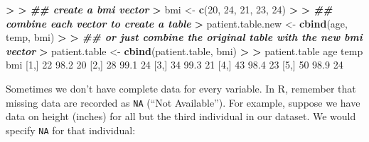 \documentclass[
]{book}
\newenvironment{Shaded}{\begin{snugshade}}{\end{snugshade}}
\newcommand{\DecValTok}[1]{\textcolor[rgb]{0.00,0.00,0.81}{#1}}
\newcommand{\DocumentationTok}[1]{\textcolor[rgb]{0.56,0.35,0.01}{\textbf{\textit{#1}}}}
\newcommand{\ErrorTok}[1]{\textcolor[rgb]{0.64,0.00,0.00}{\textbf{#1}}}
\newcommand{\FloatTok}[1]{\textcolor[rgb]{0.00,0.00,0.81}{#1}}
\newcommand{\FunctionTok}[1]{\textcolor[rgb]{0.13,0.29,0.53}{\textbf{#1}}}
\newcommand{\NormalTok}[1]{#1}
\newcommand{\OtherTok}[1]{\textcolor[rgb]{0.56,0.35,0.01}{#1}}
\newcommand{\SpecialCharTok}[1]{\textcolor[rgb]{0.81,0.36,0.00}{\textbf{#1}}}
\begin{document}
\begin{Shaded}
\begin{Highlighting}[]
\SpecialCharTok{\textgreater{}} 
\ErrorTok{\textgreater{}} \DocumentationTok{\#\# create a bmi vector}
\ErrorTok{\textgreater{}}\NormalTok{ bmi }\OtherTok{\textless{}{-}} \FunctionTok{c}\NormalTok{(}\DecValTok{20}\NormalTok{, }\DecValTok{24}\NormalTok{, }\DecValTok{21}\NormalTok{, }\DecValTok{23}\NormalTok{, }\DecValTok{24}\NormalTok{)}
\SpecialCharTok{\textgreater{}} 
\ErrorTok{\textgreater{}} \DocumentationTok{\#\# combine each vector to create a table}
\ErrorTok{\textgreater{}}\NormalTok{ patient.table.new }\OtherTok{\textless{}{-}} \FunctionTok{cbind}\NormalTok{(age, temp, bmi)}
\SpecialCharTok{\textgreater{}} 
\ErrorTok{\textgreater{}} \DocumentationTok{\#\# or just combine the original table with the new bmi vector}
\ErrorTok{\textgreater{}}\NormalTok{ patient.table }\OtherTok{\textless{}{-}} \FunctionTok{cbind}\NormalTok{(patient.table, bmi)}
\SpecialCharTok{\textgreater{}} 
\ErrorTok{\textgreater{}}\NormalTok{ patient.table}
\NormalTok{     age temp bmi}
\NormalTok{[}\DecValTok{1}\NormalTok{,]  }\DecValTok{22} \FloatTok{98.2}  \DecValTok{20}
\NormalTok{[}\DecValTok{2}\NormalTok{,]  }\DecValTok{28} \FloatTok{99.1}  \DecValTok{24}
\NormalTok{[}\DecValTok{3}\NormalTok{,]  }\DecValTok{34} \FloatTok{99.3}  \DecValTok{21}
\NormalTok{[}\DecValTok{4}\NormalTok{,]  }\DecValTok{43} \FloatTok{98.4}  \DecValTok{23}
\NormalTok{[}\DecValTok{5}\NormalTok{,]  }\DecValTok{50} \FloatTok{98.9}  \DecValTok{24}
\end{Highlighting}
\end{Shaded}

Sometimes we don't have complete data for every variable. In R, remember that missing data are recorded as \texttt{NA} (``Not Available''). For example, suppose we have data on height (inches) for all but the third individual in our dataset. We would specify \texttt{NA} for that individual:
\end{document}
